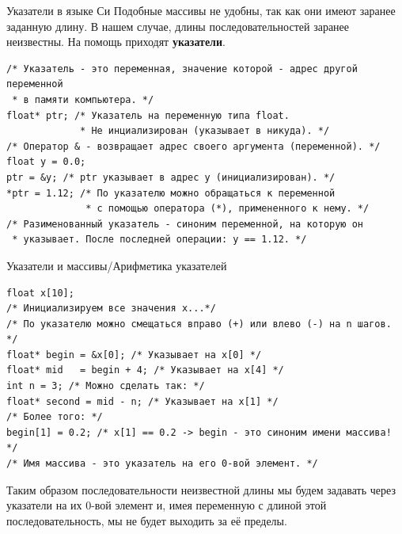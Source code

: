\documentclass{beamer}
\begin{document}
    \begin{frame}[fragile]{Указатели в языке Си}
        \justifying
        Подобные массивы не удобны, так как они имеют заранее заданную длину. 
        В нашем случае, длины последовательностей заранее неизвестны. На помощь приходят {\bf указатели}.
        \begin{verbatim}
/* Указатель - это переменная, значение которой - адрес другой переменной 
 * в памяти компьютера. */
float* ptr; /* Указатель на переменную типа float. 
             * Не инциализирован (указывает в никуда). */
/* Оператор & - возвращает адрес своего аргумента (переменной). */
float y = 0.0;
ptr = &y; /* ptr указывает в адрес y (инициализирован). */ 
*ptr = 1.12; /* По указателю можно обращаться к переменной 
              * с помощью оператора (*), примененного к нему. */
/* Разименованный указатель - синоним переменной, на которую он 
 * указывает. После последней операции: y == 1.12. */
        \end{verbatim}
    \end{frame}
    \begin{frame}[fragile]{Указатели и массивы/Арифметика указателей}
        \begin{verbatim}
float x[10]; 
/* Инициализируем все значения x...*/
/* По указателю можно смещаться вправо (+) или влево (-) на n шагов. */
float* begin = &x[0]; /* Указывает на x[0] */
float* mid   = begin + 4; /* Указывает на x[4] */
int n = 3; /* Можно сделать так: */
float* second = mid - n; /* Указывает на x[1] */
/* Более того: */
begin[1] = 0.2; /* x[1] == 0.2 -> begin - это синоним имени массива! */
/* Имя массива - это указатель на его 0-вой элемент. */
        \end{verbatim}
        \justifying
        Таким образом последовательности неизвестной длины мы будем задавать через указатели на их 0-вой элемент и, имея переменную с длиной этой последовательность, мы не будет выходить за её пределы.
    \end{frame}
\end{document}
